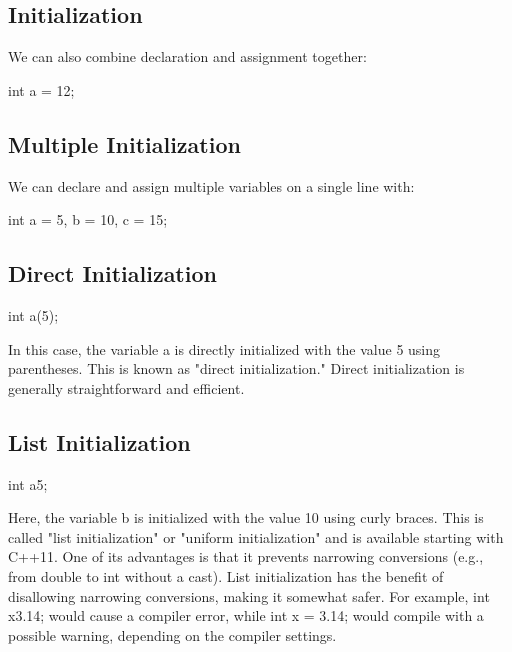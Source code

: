 \documentclass{report}
\begin{document}
    \bigbreak \noindent 
    \subsection{Initialization}
    \bigbreak \noindent 
    We can also combine declaration and assignment together:
    \bigbreak \noindent 
    
    \begin{cppcode}
int a = 12;
    \end{cppcode}
    

    \bigbreak \noindent 
    \subsection{Multiple Initialization}
    \bigbreak \noindent 
    We can declare and assign multiple variables on a single line with:
    \bigbreak \noindent 
    
    \begin{cppcode}
int a = 5, b = 10, c = 15;
    \end{cppcode}
    

    \bigbreak \noindent 
    \subsection{Direct Initialization}
    \bigbreak \noindent 
    
    \begin{cppcode}
int a(5);
    \end{cppcode}
    
    \bigbreak \noindent 
    In this case, the variable a is directly initialized with the value 5 using parentheses. This is known as "direct initialization." Direct initialization is generally straightforward and efficient.

    \bigbreak \noindent 
    \subsection{List Initialization}
    \bigbreak \noindent 
    
    \begin{cppcode}
int a{5};
    \end{cppcode}
    
    \bigbreak \noindent 
    Here, the variable b is initialized with the value 10 using curly braces. This is called "list initialization" or "uniform initialization" and is available starting with C++11. One of its advantages is that it prevents narrowing conversions (e.g., from double to int without a cast).
    \bigbreak \noindent 
    List initialization has the benefit of disallowing narrowing conversions, making it somewhat safer. For example, int x{3.14}; would cause a compiler error, while int x = 3.14; would compile with a possible warning, depending on the compiler settings.
\end{document}

